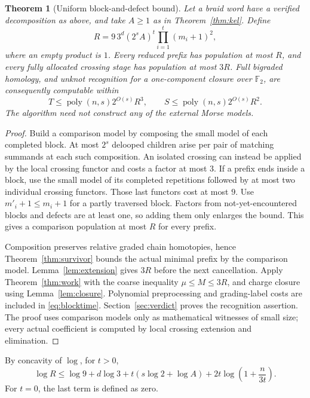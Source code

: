 \documentclass[11pt,letterpaper]{article}
\newtheorem{theorem}{Theorem}[section]
\theoremstyle{remark}\newtheorem{remark}[theorem]{Remark}
\newcommand{\F}{\mathbb F}
\newcommand{\poly}{\operatorname{poly}}
\begin{document}
\begin{theorem}[Uniform block-and-defect bound]\label{thm:blocks}
Let a braid word have a verified decomposition as above, and take $A\ge1$ as in Theorem~\ref{thm:kel}. Define
\begin{equation}\label{eq:R}
 R=9\,3^d(2^s A)^t\prod_{i=1}^t(m_i+1)^2,
\end{equation}
where an empty product is $1$. Every reduced prefix has population at most $R$, and every fully allocated crossing stage has population at most $3R$. Full bigraded homology, and unknot recognition for a one-component closure over $\F_2$, are consequently computable within
\begin{equation}\label{eq:blocktime}
 T\le\poly(n,s)2^{O(s)}R^3,\qquad
 S\le\poly(n,s)2^{O(s)}R^2.
\end{equation}
The algorithm need not construct any of the external Morse models.
\end{theorem}
\begin{proof}
Build a comparison model by composing the small model of each completed block. At most $2^s$ delooped children arise per pair of matching summands at each such composition. An isolated crossing can instead be applied by the local crossing functor and costs a factor at most $3$. If a prefix ends inside a block, use the small model of its completed repetitions followed by at most two individual crossing functors. Those last functors cost at most $9$. Use $m'_i+1\le m_i+1$ for a partly traversed block. Factors from not-yet-encountered blocks and defects are at least one, so adding them only enlarges the bound. This gives a comparison population at most $R$ for every prefix.

Composition preserves relative graded chain homotopies, hence Theorem~\ref{thm:survivor} bounds the actual minimal prefix by the comparison model. Lemma~\ref{lem:extension} gives $3R$ before the next cancellation. Apply Theorem~\ref{thm:work} with the coarse inequality $\mu\le M\le3R$, and charge closure using Lemma~\ref{lem:closure}. Polynomial preprocessing and grading-label costs are included in \eqref{eq:blocktime}. Section~\ref{sec:verdict} proves the recognition assertion. The proof uses comparison models only as mathematical witnesses of small size; every actual coefficient is computed by local crossing extension and elimination.
\end{proof}

By concavity of $\log$, for $t>0$,
\begin{equation}\label{eq:logR}
 \log R\le\log9+d\log3+t(s\log2+\log A)
 +2t\log\!\left(1+\frac{n}{3t}\right).
\end{equation}
For $t=0$, the last term is defined as zero.
\end{document}
